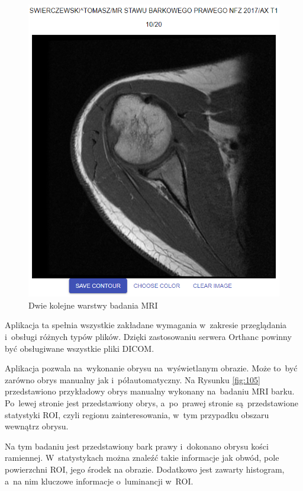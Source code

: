 \documentclass[a4paper,11pt,twoside,openright]{report}
\theoremstyle{definition}
\begin{document}
\begin{figure}[h!]
\begin{center}
\begin{center}
		\includegraphics[width=1.0\textwidth]{140}
	\end{center}
	\endminipage\hfill
	\caption{Dwie kolejne warstwy badania MRI}
	\label{fig:140}
\end{center}
\end{figure}


Aplikacja ta spełnia wszystkie zakładane wymagania w~zakresie przeglądania i~obsługi różnych typów plików.
Dzięki zastosowaniu serwera Orthanc powinny być obsługiwane wszystkie pliki DICOM.

\bigskip

Aplikacja pozwala na~wykonanie obrysu na~wyświetlanym obrazie. Może to~być zarówno obrys
manualny jak i~półautomatyczny. Na Rysunku \ref{fig:105} przedstawiono przykładowy obrys manualny
wykonany na~badaniu MRI barku. Po~lewej stronie jest przedstawiony obrys, a~po~prawej
stronie są~przedstawione statystyki ROI, czyli regionu zainteresowania, w~tym przypadku obszaru
wewnątrz obrysu.

Na tym badaniu jest przedstawiony bark prawy i~dokonano obrysu kości ramiennej. W~statystykach można
znaleźć takie informacje jak obwód, pole powierzchni ROI, jego środek na obrazie. Dodatkowo jest zawarty
histogram, a~na nim kluczowe informacje o~luminancji w~ROI.
\end{document}
